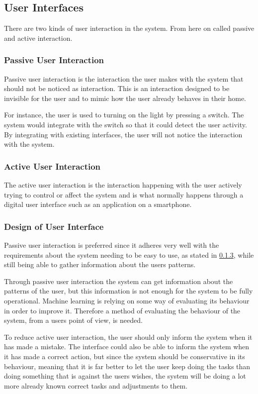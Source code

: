 \subsection{User Interfaces}
There are two kinds of user interaction in the system. From here on called passive and active interaction.

\subsubsection{Passive User Interaction}
Passive user interaction is the interaction the user makes with the system that
should not be noticed as interaction. This is an interaction designed to be
invisible for the user and to mimic how the user already behaves in their home.

For instance, the user is used to turning on the light by pressing a switch. The
system would integrate with the switch so that it could detect the user
activity. By integrating with existing interfaces, the user will not notice the
interaction with the system.

\subsubsection{Active User Interaction}
The active user interaction is the interaction happening with the user actively
trying to control or affect the system and is what normally happens through a
digital user interface such as an application on a smartphone.

\subsubsection{Design of User Interface}
Passive user interaction is preferred since it adheres very well with the
requirements about the system needing to be easy to use, as stated in
\cref{}, while still being
able to gather information about the users patterns.

Through passive user interaction the system can get information about the
patterns of the user, but this information is not enough for the system to be
fully operational. Machine learning is relying on some way of evaluating its
behaviour in order to improve it. Therefore a method of evaluating the behaviour
of the system, from a users point of view, is needed.
 
To reduce active user interaction, the user should only inform the system when
it has made a mistake. The interface could also be able to inform the system
when it has made a correct action, but since the system should be conservative in
its behaviour, meaning that it is far better to let the user keep doing the
tasks than doing something that is against the users wishes, the system will be
doing a lot more already known correct tasks and adjustments to them.

